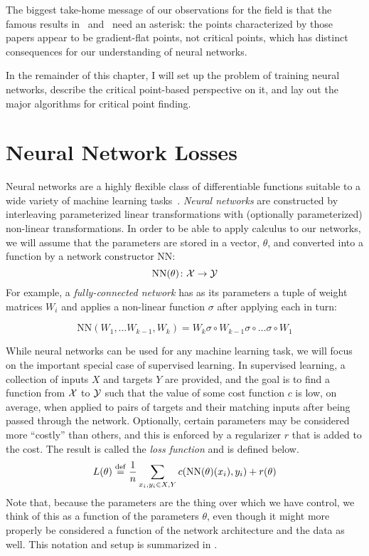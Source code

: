 \documentclass[../../thesis.tex]{subfiles}
\begin{document}
The biggest take-home message of our observations for the field
is that the famous results
in~\cite{dauphin2014} and~\cite{pennington2017}
need an asterisk:
the points characterized by those papers appear to be
gradient-flat points, not critical points,
which has distinct consequences for our understanding of neural networks.

In the remainder of this chapter,
I will set up the problem of training neural networks,
describe the critical point-based perspective on it,
and lay out the major algorithms for critical point finding.

\section{Neural Network Losses}

Neural networks are a highly flexible class of
differentiable functions
suitable to a wide variety of
machine learning tasks~\cite{lecun2015}.
\emph{Neural networks} are constructed by interleaving
parameterized linear transformations
with (optionally parameterized) non-linear transformations.
In order to be able to apply calculus
to our networks, we will assume that
the parameters are stored in a vector, $\theta$,
and converted into a function by a network constructor $\mathrm{NN}$:
\begin{equation}
	\mathrm{NN}(\theta) \colon {\mathcal{X}} \to {\mathcal{Y}}
\end{equation}
For example,
a \emph{fully-connected network}
has as its parameters a tuple of weight matrices $W_i$
and applies a non-linear function $\sigma$
after applying each in turn:

\begin{equation}
	\mathrm{NN}\left(W_1, \dots W_{k-1}, W_k\right) = W_k \sigma \circ W_{k-1} \sigma \circ \dots \sigma \circ W_1
\end{equation}

While neural networks can be used for any machine learning task,
we will focus on the important special case of supervised learning.
In supervised learning, a collection of inputs $X$ and targets $Y$
are provided, and the goal is to find a function from ${\mathcal{X}}$ to ${\mathcal{Y}}$
such that the value of some cost function $c$ is low, on average, when applied to
pairs of targets and their matching inputs after being passed through the network.
Optionally, certain parameters may be considered more \enquote{costly}
than others, and this is enforced by a regularizer $r$
that is added to the cost.
The result is called the \emph{loss function}
and is defined below.
\begin{equation}\equationlabel{def-loss}
	L(\theta) \defeq \frac{1}{n}\sum_{x_i, y_i \in X, Y} c(\mathrm{NN}(\theta)(x_i), y_i) + r(\theta)
\end{equation}
Note that,
because the parameters are the thing over which we have control,
we think of this as a function of the parameters $\theta$,
even though it might more properly be considered
a function of the network architecture and the data as well.
This notation and setup is summarized in .
\end{document}
